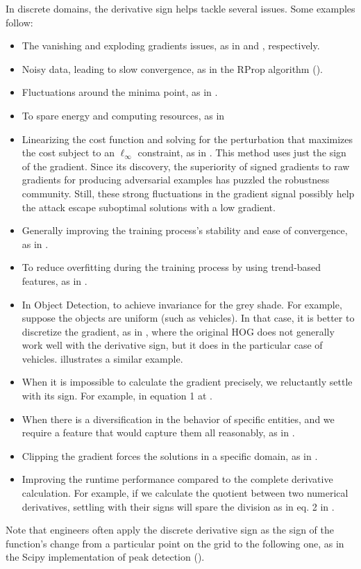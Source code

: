 \documentclass[11pt]{book}
\begin{document}
In discrete domains, the derivative sign helps tackle several issues.
Some examples follow:
\begin{itemize}
\item The vanishing and exploding gradients issues, as in \cite{abuqaddom2021oriented}
and \cite{ravi2016optimization}, respectively.
\item Noisy data, leading to slow convergence, as in the RProp algorithm
(\cite{riedmiller1993direct}).
\item Fluctuations around the minima point, as in \cite{wang2019spi}.
\item To spare energy and computing resources, as in \cite{hubara2017quantized}
\item Linearizing the cost function and solving for the perturbation that
maximizes the cost subject to an $\ell_{\infty}$ constraint, as in
\cite{goodfellow2014explaining}. This
method uses just the sign of the gradient. Since its discovery, the
superiority of signed gradients to raw gradients for producing adversarial
examples has puzzled the robustness community. Still, these strong
fluctuations in the gradient signal possibly help the attack escape
suboptimal solutions with a low gradient.
\item Generally improving the training process's stability and ease of convergence,
as in \cite{li2018a2}.
\item To reduce overfitting during the training process by using trend-based
features, as in \cite{wulsin2011modeling}.
\item In Object Detection, to achieve invariance for the grey shade. For
example, suppose the objects are uniform (such as vehicles). In that
case, it is better to discretize the gradient, as in \cite{arrospide2013image},
where the original HOG does not generally work well with the derivative
sign, but it does in the particular case of vehicles. \cite{ojala2002multiresolution}
illustrates a similar example.
\item When it is impossible to calculate the gradient precisely, we reluctantly
settle with its sign. For example, in equation 1 at \cite{dong2018fast}.
\item When there is a diversification in the behavior of specific entities,
and we require a feature that would capture them all reasonably, as
in \cite{schramm2014dynamic}.
\item Clipping the gradient forces the solutions in a specific domain, as
in \cite{moosavi2019robustness}.
\item Improving the runtime performance compared to the complete derivative
calculation. For example, if we calculate the quotient between two
numerical derivatives, settling with their signs will spare the division
as in eq. 2 in \cite{huang2017robust}.
\end{itemize}
Note that engineers often apply the discrete derivative sign as the
sign of the function's change from a particular point on the grid
to the following one, as in the Scipy implementation of peak detection
(\cite{scipy2018}).
\end{document}
